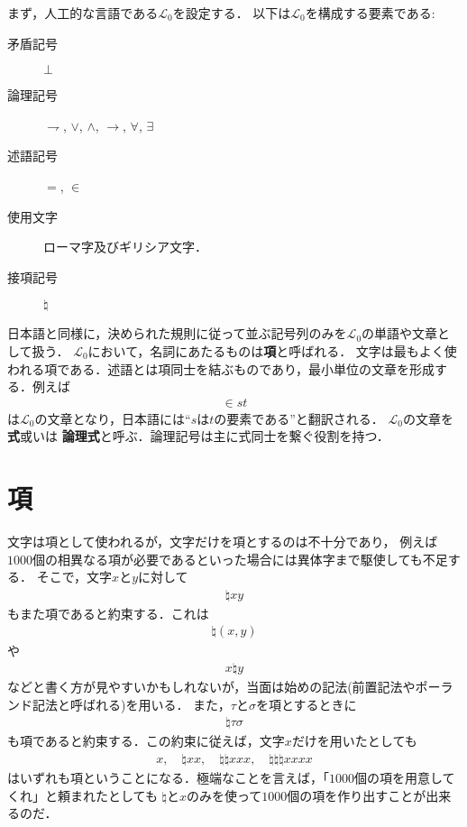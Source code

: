 \documentclass[a4j,10.5pt,oneside,openany]{jsbook}
\theoremstyle{mystyle}
\begin{document}
	まず，人工的な言語である$\mathcal{L}_{0}$を設定する．
	以下は$\mathcal{L}_{0}$を構成する要素である:
	\begin{description}
		\item[矛盾記号] $\bot$
		\item[論理記号] $\rightharpoondown$, $\vee$, $\wedge$, $\rightarrow$, $\forall$, $\exists$
		\item[述語記号] $=$, $\in$
		\item[使用文字] ローマ字及びギリシア文字．
		\item[接項記号] $\natural$
	\end{description}
	
	日本語と同様に，決められた規則に従って並ぶ記号列のみを$\mathcal{L}_{0}$の単語や文章として扱う．
	$\mathcal{L}_{0}$において，名詞にあたるものは{\bf 項}と呼ばれる．
	文字は最もよく使われる項である．述語とは項同士を結ぶものであり，最小単位の文章を形成する．例えば
	\begin{align}
		\in st
	\end{align}
	は$\mathcal{L}_{0}$の文章となり，日本語には``$s$は$t$の要素である''と翻訳される．
	$\mathcal{L}_{0}$の文章を{\bf 式}或いは
	{\bf 論理式}と呼ぶ．論理記号は主に式同士を繋ぐ役割を持つ．
	
\section{項}
	
	文字は項として使われるが，文字だけを項とするのは不十分であり，
	例えば$1000$個の相異なる項が必要であるといった場合には異体字まで駆使しても不足する．
	そこで，文字$x$と$y$に対して
	\begin{align}
		\natural xy
	\end{align}
	もまた項であると約束する．これは
	\begin{align}
		\natural(x,y)
	\end{align}
	や
	\begin{align}
		x \natural y
	\end{align}
	などと書く方が見やすいかもしれないが，当面は始めの記法(前置記法やポーランド記法と呼ばれる)を用いる．
	また，$\tau$と$\sigma$を項とするときに
	\begin{align}
		\natural \tau \sigma
	\end{align}
	も項であると約束する．この約束に従えば，文字$x$だけを用いたとしても
	\begin{align}
		x,\quad \natural xx, \quad \natural \natural xxx, \quad \natural \natural \natural xxxx
	\end{align}
	はいずれも項ということになる．極端なことを言えば，「$1000$個の項を用意してくれ」と頼まれたとしても
	$\natural$と$x$のみを使って$1000$個の項を作り出すことが出来るのだ．
	
\end{document}
